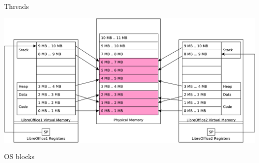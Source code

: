 \documentclass{beamer}
\begin{document}
\begin{frame}{Threads}
\begin{center}
  \includegraphics[width=1\linewidth]{thread}
\end{center}
\end{frame}

\begin{frame}{OS blocks}
\begin{center}
\end{center}
\end{frame}
\end{document}
